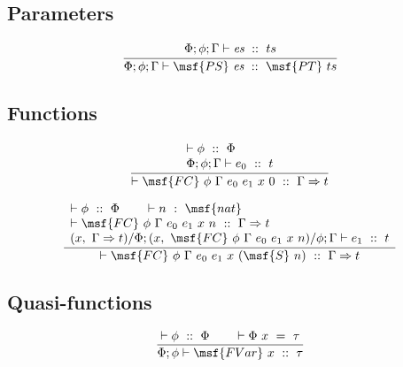 \documentclass{article}
\begin{document}
\subsection{Parameters}


\begin{gather}
  \frac{\begin{array}{lll}
    \Phi; \phi; \Gamma \vdash \mbox{\it es} \ :: \ ts 
    \end{array}
  }{ \Phi; \phi; \Gamma \vdash \msf{PS} \ \mbox{\it es} \ ::
    \ \msf{PT} \ ts }
\end{gather}



\subsection{Functions}


\begin{gather}
  \frac{
\begin{array}{lll}  
  \vdash \phi \ :: \ \Phi  \\
  \Phi; \phi; \Gamma \vdash e_0 \ :: \ t \\ 
\end{array}  
  }{ \vdash \msf{FC} \ \phi \ \Gamma \ e_0 \ e_1 \ x \ 0 \ :: \ \Gamma
    \Rightarrow t}
\end{gather}

\begin{gather}
  \frac{
\begin{array}{lll}  
  \vdash \phi \ :: \ \Phi \qquad \vdash n \ : \ \msf{nat} \\ \vdash
  \msf{FC} \ \phi \ \Gamma \ e_0 \ e_1 \ x \ n \ :: \ \Gamma
  \Rightarrow t \\ (x, \ \Gamma \Rightarrow t) / \Phi; (x, \ \msf{FC}
  \ \phi \ \Gamma \ e_0 \ e_1 \ x \ n) / \phi; \Gamma \vdash e_1 \ ::
  \ t \\
\end{array}  
  }{ \vdash \msf{FC} \ \phi \ \Gamma \ e_0 \ e_1 \ x \ (\msf{S} \ n)
    \ :: \ \Gamma \Rightarrow t}
\end{gather}




\subsection{Quasi-functions}


\begin{gather}
\frac{\vdash \phi \ :: \ \Phi \qquad \vdash \Phi \ x \ = \ \tau}{\Phi;
  \phi \vdash \msf{FVar} \ x \ :: \ \tau}
\end{gather}
\end{document}
